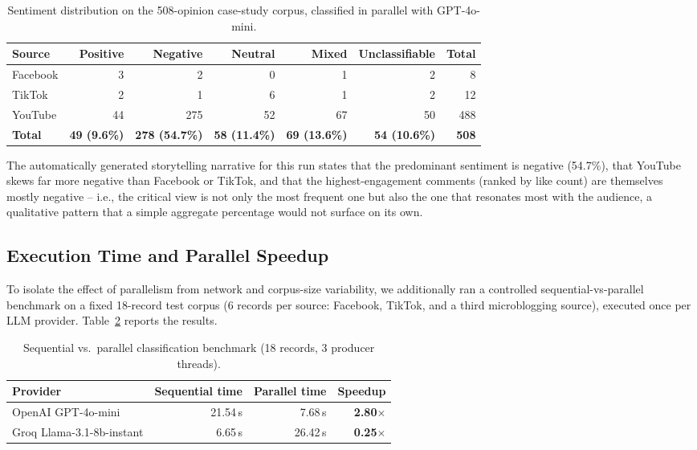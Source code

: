 \documentclass[runningheads]{llncs}
\begin{document}
\begin{table}[t]
\centering
\caption{Sentiment distribution on the 508-opinion case-study corpus, classified in parallel with GPT-4o-mini.}
\label{tab:distribution}
\begin{tabular}{lrrrrrr}
\toprule
Source & Positive & Negative & Neutral & Mixed & Unclassifiable & Total \\
\midrule
Facebook & 3 & 2 & 0 & 1 & 2 & 8 \\
TikTok   & 2 & 1 & 6 & 1 & 2 & 12 \\
YouTube  & 44 & 275 & 52 & 67 & 50 & 488 \\
\midrule
\textbf{Total} & \textbf{49 (9.6\%)} & \textbf{278 (54.7\%)} & \textbf{58 (11.4\%)} & \textbf{69 (13.6\%)} & \textbf{54 (10.6\%)} & \textbf{508} \\
\bottomrule
\end{tabular}
\end{table}

The automatically generated storytelling narrative for this run states that
the predominant sentiment is negative (54.7\%), that YouTube skews far more
negative than Facebook or TikTok, and that the highest-engagement comments
(ranked by like count) are themselves mostly negative -- i.e., the critical
view is not only the most frequent one but also the one that resonates most
with the audience, a qualitative pattern that a simple aggregate percentage
would not surface on its own.

\subsection{Execution Time and Parallel Speedup}

To isolate the effect of parallelism from network and corpus-size
variability, we additionally ran a controlled sequential-vs-parallel
benchmark on a fixed 18-record test corpus (6 records per source: Facebook,
TikTok, and a third microblogging source), executed once per LLM provider.
Table~\ref{tab:benchmark} reports the results.

\begin{table}[t]
\centering
\caption{Sequential vs.\ parallel classification benchmark (18 records, 3 producer threads).}
\label{tab:benchmark}
\begin{tabular}{lrrr}
\toprule
Provider & Sequential time & Parallel time & Speedup \\
\midrule
OpenAI GPT-4o-mini & 21.54\,s & 7.68\,s & \textbf{2.80$\times$} \\
Groq Llama-3.1-8b-instant & 6.65\,s & 26.42\,s & \textbf{0.25$\times$} \\
\bottomrule
\end{tabular}
\end{table}
\end{document}
